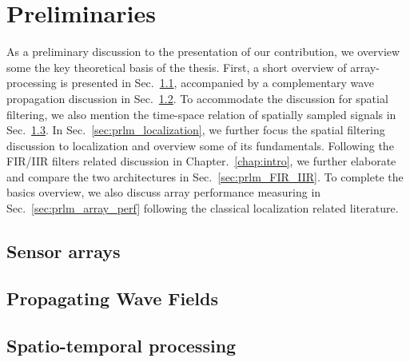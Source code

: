 \chapter{Preliminaries}
\label{chap:prelims}
As a preliminary discussion to the presentation of our contribution, we overview some the key theoretical basis of the thesis.
First, a short overview of array-processing is presented in Sec.~\ref{sec:prlm_sensorArrays}, accompanied by a complementary wave propagation discussion in Sec.~\ref{sec:prlm_propWaveField}.
To accommodate the discussion for spatial filtering, we also mention the time-space relation of spatially sampled signals in Sec.~\ref{sec:prlm_timeSpaceSig}.
In Sec.~\ref{sec:prlm_localization}, we further focus the spatial filtering discussion to localization and overview some of its fundamentals.
Following the FIR/IIR filters related discussion in Chapter.~\ref{chap:intro}, we further elaborate and compare the two architectures in Sec.~\ref{sec:prlm_FIR_IIR}.
To complete the basics overview, we also discuss array performance measuring in Sec.~\ref{sec:prlm_array_perf} following the classical localization related literature.

% 
\section{Sensor arrays}
\label{sec:prlm_sensorArrays}

\section{Propagating Wave Fields}
\label{sec:prlm_propWaveField}

\section{Spatio-temporal processing}
\label{sec:prlm_timeSpaceSig}

